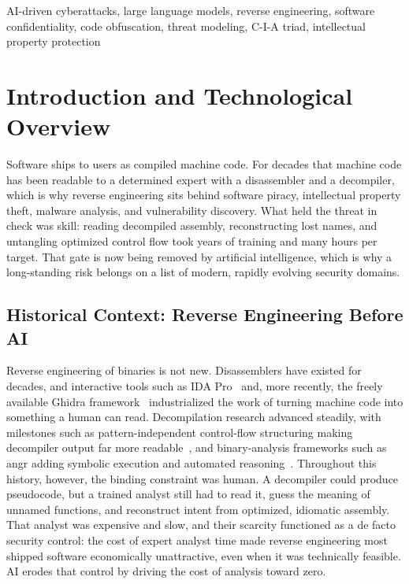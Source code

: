 \documentclass[conference]{IEEEtran}
\begin{document}
\begin{IEEEkeywords}
AI-driven cyberattacks, large language models, reverse engineering, software
confidentiality, code obfuscation, threat modeling, C-I-A triad, intellectual
property protection
\end{IEEEkeywords}

\section{Introduction and Technological Overview}
Software ships to users as compiled machine code. For decades that machine code has
been readable to a determined expert with a disassembler and a decompiler, which is
why reverse engineering sits behind software piracy, intellectual property theft,
malware analysis, and vulnerability discovery. What held the threat in check was
skill: reading decompiled assembly, reconstructing lost names, and untangling
optimized control flow took years of training and many hours per target. That gate
is now being removed by artificial intelligence, which is why a long-standing risk
belongs on a list of modern, rapidly evolving security domains.

\subsection{Historical Context: Reverse Engineering Before AI}
Reverse engineering of binaries is not new. Disassemblers have existed for decades,
and interactive tools such as IDA Pro~\cite{idabook} and, more recently, the freely
available Ghidra framework~\cite{ghidra} industrialized the work of turning machine
code into something a human can read. Decompilation research advanced steadily,
with milestones such as pattern-independent control-flow structuring making
decompiler output far more readable~\cite{nomoregotos}, and binary-analysis
frameworks such as angr adding symbolic execution and automated
reasoning~\cite{angr}. Throughout this history, however, the binding constraint was
human. A decompiler could produce pseudocode, but a trained analyst still had to
read it, guess the meaning of unnamed functions, and reconstruct intent from
optimized, idiomatic assembly. That analyst was expensive and slow, and their
scarcity functioned as a de facto security control: the cost of expert analyst time
made reverse engineering most shipped software economically unattractive, even
when it was technically feasible. AI erodes that control by driving the cost of
analysis toward zero.
\end{document}
